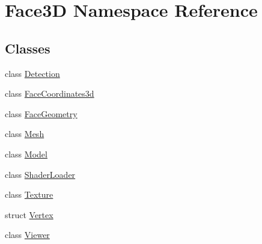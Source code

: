 \hypertarget{namespace_face3_d}{}\section{Face3D Namespace Reference}
\label{namespace_face3_d}
\subsection*{Classes}
\begin{DoxyCompactItemize}
\item 
class \hyperlink{class_face3_d_1_1_detection}{Detection}
\item 
class \hyperlink{class_face3_d_1_1_face_coordinates3d}{Face\+Coordinates3d}
\item 
class \hyperlink{class_face3_d_1_1_face_geometry}{Face\+Geometry}
\item 
class \hyperlink{class_face3_d_1_1_mesh}{Mesh}
\item 
class \hyperlink{class_face3_d_1_1_model}{Model}
\item 
class \hyperlink{class_face3_d_1_1_shader_loader}{Shader\+Loader}
\item 
class \hyperlink{class_face3_d_1_1_texture}{Texture}
\item 
struct \hyperlink{struct_face3_d_1_1_vertex}{Vertex}
\item 
class \hyperlink{class_face3_d_1_1_viewer}{Viewer}
\end{DoxyCompactItemize}
